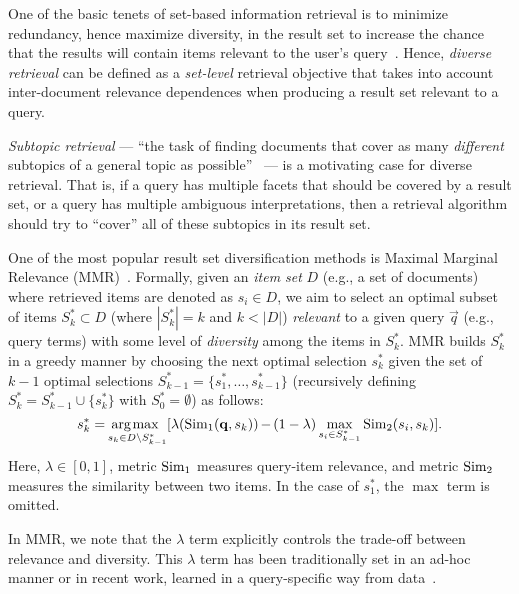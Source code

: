 One of the basic tenets of set-based information retrieval is to
minimize redundancy, hence maximize diversity, in the result set to
increase the chance that the results will contain items relevant to
the user's query~\cite{goffman64OnRelevanceAsAMeasure}.  Hence, \emph{diverse retrieval}
can be defined as a \emph{set-level} retrieval objective that takes
into account inter-document relevance dependences when producing a
result set relevant to a query.

\emph{Subtopic retrieval} --- ``the task of finding documents that
cover as many \emph{different} subtopics of a general topic as
possible''~\cite{zhai03Beyond} --- is a
motivating case for diverse retrieval.  That is, if a query has
multiple facets that should be covered by a result set, or a query has
multiple ambiguous interpretations, then a retrieval algorithm should
try to ``cover'' all of these subtopics in its result set.

One of the most popular result set diversification methods is Maximal
Marginal Relevance (MMR)~\cite{carbonell98MMR}.  
Formally, given an \emph{item set} $D$ (e.g., a set of documents) where retrieved items
are denoted as $s_i \in D$, we aim to select an optimal subset of
items $S_k^* \subset D$ (where $|S_k^*| = k$ and $k < |D|$)
\emph{relevant} to a given query $\vec{q}$ (e.g., query terms) with
some level of \emph{diversity} among the items in $S_k^*$.  MMR
builds $S_k^*$ in a greedy manner by choosing the next optimal
selection $s_k^*$ given the set of $k-1$ optimal selections
$S_{k-1}^* = \{ s_1^*, \ldots, s_{k-1}^* \}$ (recursively defining
$S_k^* = S_{k-1}^* \cup \{ s_k^* \}$ with $S_0^* = \emptyset$)
as follows:
\begin{equation}\label{eq:MMR}
 s_k^* = \hspace{-.3mm} \argmax_{s_k \in D \setminus S_{k-1}^*} [ \lambda(\Sim_{1}(\vec{q},s_k))\hspace{-.3mm}-\hspace{-.3mm}(1-\lambda)\max_{s_i \in S_{k-1}^*} \Sim_{2}(s_i,s_k) ].
\end{equation}
Here, 
$\lambda \in [0, 1]$, metric $\mathrm{Sim}_{1}$ measures
query-item relevance, and metric $\mathrm{Sim}_{2}$ measures the similarity
between two items. In the case of $s_1^*$, the $\max$ term is omitted.

In MMR, we note that the $\lambda$ term explicitly controls the
trade-off between relevance and diversity. This $\lambda$ term has been traditionally set in an ad-hoc manner or
in recent work, learned in a query-specific way from data~\cite{santos2010selectively}.  

